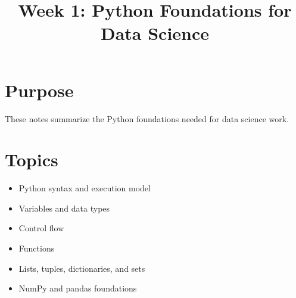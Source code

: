 \documentclass[11pt]{article}
\title{Week 1: Python Foundations for Data Science}
\author{}
\date{}
\begin{document}
\maketitle

\section{Purpose}

These notes summarize the Python foundations needed for data science work.

\section{Topics}

\begin{itemize}
  \item Python syntax and execution model
  \item Variables and data types
  \item Control flow
  \item Functions
  \item Lists, tuples, dictionaries, and sets
  \item NumPy and pandas foundations
\end{itemize}
\end{document}
